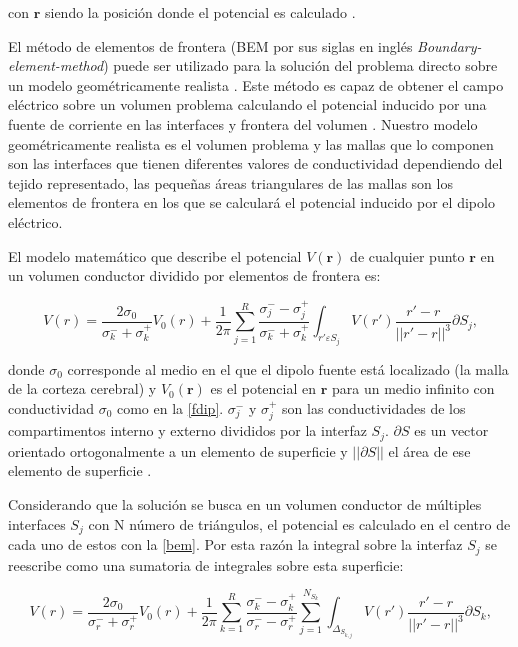 con $\mathbf{r}$ siendo la posición donde el potencial es calculado \cite{Hallez2007}.

El método de elementos de frontera (BEM por sus siglas en inglés \emph{Boundary-element-method}) puede ser utilizado para la solución del problema directo sobre un modelo geométricamente realista \cite{Ermer2001}. Este método es capaz de obtener el campo eléctrico sobre un volumen problema calculando el potencial inducido por una fuente de corriente en las interfaces y frontera del volumen \cite{Hallez2007}. Nuestro modelo geométricamente realista es el volumen problema y las mallas que lo componen son las interfaces que tienen diferentes valores de conductividad dependiendo del tejido representado, las pequeñas áreas triangulares de las mallas son los elementos de frontera en los que se calculará el potencial inducido por el dipolo eléctrico.

El modelo matemático que describe el potencial $V(\mathbf{r})$ de cualquier punto $\mathbf{r}$ en un volumen conductor dividido por elementos de frontera es:

\begin{equation}
	\label{bem}
	V(r) = \frac{2\sigma_{0}}{\sigma_{k}^{-} + {\sigma_{k}^{+}}} V_{0}(r) + \frac{1}{2\pi} \sum_{j=1}^{R}\frac{\sigma_{j}^{-}-\sigma_{j}^{+}}{\sigma_{k}^{-}+\sigma_{k}^{+}} \int_{r'\varepsilon S_{j}} V(r') \frac{r'-r}{||r'-r||^3}\partial S_{j}\text{,}
\end{equation}

donde $\sigma_{0}$ corresponde al medio en el que el dipolo fuente está localizado (la malla de la corteza cerebral) y $V_{0}(\mathbf{r})$ es el potencial en $\mathbf{r}$ para un medio infinito con conductividad $\sigma_{0}$ como en la \cref{fdip}. $\sigma_{j}^{-}$ y $\sigma_{j}^{+}$ son las conductividades de los compartimentos interno y externo divididos por la interfaz $S_{j}$. $\partial S$ es un vector orientado ortogonalmente a un elemento de superficie y $||\partial S||$ el área de ese elemento de superficie \cite{Hallez2007}. 

Considerando que la solución se busca en un volumen conductor de múltiples interfaces $S_{j}$ con N número de triángulos, el potencial es calculado en el centro de cada uno de estos con la \cref{bem}. Por esta razón la integral sobre la interfaz $S_{j}$ se reescribe como una sumatoria de integrales sobre esta superficie:

\begin{equation}
	\label{bem2}
	V(r) = \frac{2\sigma_{0}}{\sigma_{r}^{-} + {\sigma_{r}^{+}}} V_{0}(r) + \frac{1}{2\pi} \sum_{k=1}^{R}\frac{\sigma_{k}^{-}-\sigma_{k}^{+}}{\sigma_{r}^{-}-\sigma_{r}^{+}} \sum_{j=1}^{N_{S_{k}}} \int_{\Delta_{S_{k,j}}} V(r') \frac{r'-r}{||r'-r||^3}\partial S_{k}\text{,}
\end{equation}

